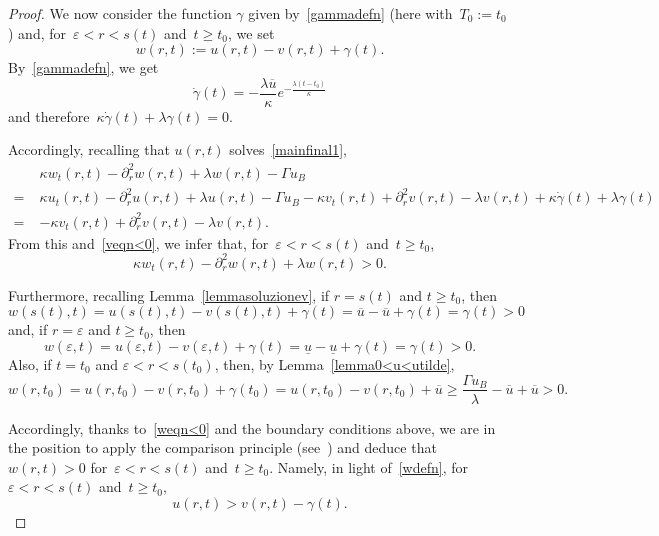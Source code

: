 \documentclass[12pt,a4paper,intlimits,sumlimits]{amsart}
\theoremstyle{definition}
\theoremstyle{plain}
\numberwithin{equation}{section}
\renewcommand{\ge}{\geqslant}
\begin{document}
\begin{proof}
We now consider the function $\gamma$ given by~\eqref{gammadefn} (here with~$T_0:=t_0$) and, for~$\varepsilon<r<s(t)$ and~$ t\ge t_0$, we set
\begin{equation}\label{wdefn}
w(r, t):= u(r, t)-v(r, t) + \gamma(t) .
\end{equation}
By~\eqref{gammadefn}, we get
\[
\dot{\gamma}(t)=-\frac{\lambda\overline{u}}{\kappa}e^{-\frac{\lambda(t-t_0)}{\kappa}}
\] and therefore~$\kappa\dot\gamma(t)+\lambda\gamma(t)=0$.

Accordingly, recalling that $u(r, t)$ solves~\eqref{mainfinal1},
\[
\begin{split}
&\kappa w_t(r, t)-\partial^2_r w(r, t) +\lambda w(r, t)-\Gamma u_B \\=\;& \kappa u_t(r, t)-\partial^2_r u(r, t)+\lambda u(r, t)-\Gamma u_B
-\kappa v_t(r, t)+\partial^2_r v(r, t) -\lambda v(r, t) +\kappa\dot{\gamma}(t) +\lambda\gamma(t)\\
=\;&-\kappa v_t(r, t)+\partial^2_r v(r, t)   -\lambda v(r, t).
\end{split}
\]
From this and~\eqref{veqn<0}, we infer that, for~$\varepsilon<r<s(t)$ and~$t\ge t_0$,
\begin{equation}\label{weqn<0}
\kappa w_t(r, t)-\partial^2_r w(r, t)  +\lambda w(r, t)>0 .
\end{equation}

Furthermore, recalling Lemma~\ref{lemmasoluzionev}, if $r=s(t)$ and $t\ge t_0$, then
$$w(s(t), t)=u(s(t), t)-v(s(t), t) + \gamma(t)
=\overline u-\overline u +\gamma(t) = \gamma(t)>0$$
and, if $r=\varepsilon$ and $t\ge t_0$, then
$$ w(\varepsilon, t)= u(\varepsilon, t)-v(\varepsilon, t) +\gamma(t)= \underline u-\underline u+\gamma(t)=\gamma(t)>0.$$
Also, if $t=t_0$ and $\varepsilon<r<s(t_0)$, then, by Lemma~\ref{lemma0<u<utilde},
$$ w(r, t_0)= u(r, t_0)-v(r, t_0) +\gamma(t_0)
=u(r, t_0)-v(r, t_0) +
\overline{u} \ge
\frac{\Gamma u_B}\lambda -\overline{u}+\overline{u}>0.$$

Accordingly, thanks to~\eqref{weqn<0} and the boundary conditions above, we are in the position to apply 
the comparison principle
(see~\cite[Corollary 2.5]{MR1465184}) and deduce that $w(r, t)>0$ for~$\varepsilon<r<s(t)$ and~$t\ge t_0$. Namely,
in light of~\eqref{wdefn}, for~$\varepsilon<r<s(t)$ and~$t\ge t_0$,
\begin{equation*}
u(r, t)>v(r, t) - \gamma(t) .
\end{equation*}


\end{proof}
\end{document}
